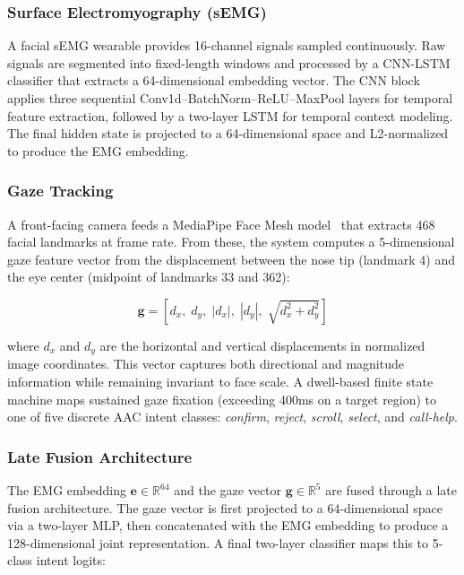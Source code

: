 \documentclass[journal]{IEEEtran}
\begin{document}
\subsubsection{Surface Electromyography (sEMG)}
A facial sEMG wearable provides 16-channel signals sampled continuously. Raw signals are segmented into fixed-length windows and processed by a CNN-LSTM classifier that extracts a 64-dimensional embedding vector. The CNN block applies three sequential Conv1d--BatchNorm--ReLU--MaxPool layers for temporal feature extraction, followed by a two-layer LSTM for temporal context modeling. The final hidden state is projected to a 64-dimensional space and L2-normalized to produce the EMG embedding.

\subsubsection{Gaze Tracking}
A front-facing camera feeds a MediaPipe Face Mesh model~\cite{mediapipe} that extracts 468 facial landmarks at frame rate. From these, the system computes a 5-dimensional gaze feature vector from the displacement between the nose tip (landmark 4) and the eye center (midpoint of landmarks 33 and 362):

\begin{equation}
\mathbf{g} = [d_x,\; d_y,\; |d_x|,\; |d_y|,\; \sqrt{d_x^2 + d_y^2}]
\label{eq:gaze_vector}
\end{equation}

\noindent where $d_x$ and $d_y$ are the horizontal and vertical displacements in normalized image coordinates. This vector captures both directional and magnitude information while remaining invariant to face scale. A dwell-based finite state machine maps sustained gaze fixation (exceeding 400ms on a target region) to one of five discrete AAC intent classes: \emph{confirm}, \emph{reject}, \emph{scroll}, \emph{select}, and \emph{call-help}.

\subsubsection{Late Fusion Architecture}
The EMG embedding $\mathbf{e} \in \mathbb{R}^{64}$ and the gaze vector $\mathbf{g} \in \mathbb{R}^{5}$ are fused through a late fusion architecture. The gaze vector is first projected to a 64-dimensional space via a two-layer MLP, then concatenated with the EMG embedding to produce a 128-dimensional joint representation. A final two-layer classifier maps this to 5-class intent logits:
\end{document}
